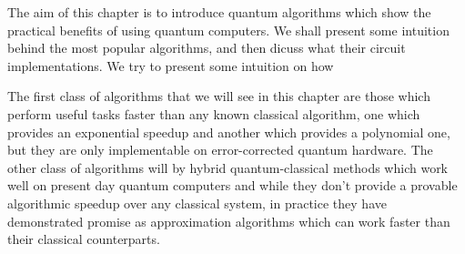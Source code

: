 The aim of this chapter is to introduce quantum algorithms which show the practical benefits of using quantum computers. We shall present some intuition behind the most popular algorithms, and then dicuss what their circuit implementations. We try to present some intuition on how 


The first class of algorithms that we will see in this chapter are those which perform useful tasks faster than any known classical algorithm, one which provides an exponential speedup and another which provides a polynomial one, but they are only implementable on error-corrected quantum hardware. The other class of algorithms will by hybrid quantum-classical methods which work well on present day quantum computers and while they don't provide a provable algorithmic speedup over any classical system, in practice they have demonstrated promise as approximation algorithms which can work faster than their classical counterparts.


